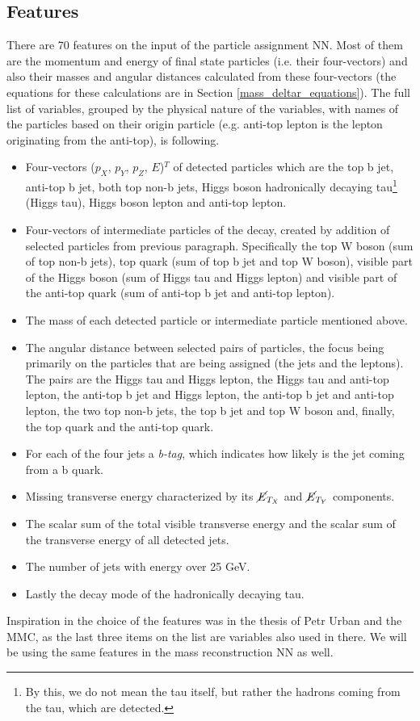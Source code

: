 \documentclass{ctuthesis}
\begin{document}
\subsection{Features}
\label{assignment_features}
There are 70 features on the input of the particle assignment NN. Most of them are the momentum and energy of final state particles (i.e. their four-vectors) and also their masses and angular distances calculated from these four-vectors (the equations for these calculations are in Section \ref{mass_deltar_equations}). The full list of variables, grouped by the physical nature of the variables, with names of the particles based on their origin particle (e.g. anti-top lepton is the lepton originating from the anti-top), is following.
\begin{itemize}
    \item Four-vectors ($p_X$, $p_Y$, $p_Z$, $E$)$^T$ of detected particles which are the top b jet, anti-top b jet, both top non-b jets, Higgs boson hadronically decaying tau\footnote{By this, we do not mean the tau itself, but rather the hadrons coming from the tau, which are detected.} (Higgs tau), Higgs boson lepton and anti-top lepton.
    \item Four-vectors of intermediate particles of the decay, created by addition of selected particles from previous paragraph. Specifically the top W boson (sum of top non-b jets), top quark (sum of top b jet and top W boson), visible part of the Higgs boson (sum of Higgs tau and Higgs lepton) and visible part of the anti-top quark (sum of anti-top b jet and anti-top lepton).
    \item The mass of each detected particle or intermediate particle mentioned above.
    \item The angular distance between selected pairs of particles, the focus being primarily on the particles that are being assigned (the jets and the leptons). The pairs are the Higgs tau and Higgs lepton, the Higgs tau and anti-top lepton, the anti-top b jet and Higgs lepton, the anti-top b jet and anti-top lepton, the two top non-b jets, the top b jet and top W boson and, finally, the top quark and the anti-top quark.
    \item For each of the four jets a \emph{b-tag}, which indicates how likely is the jet coming from a b quark.
    \item Missing transverse energy characterized by its $\cancel{E}_{T_X}$ and $\cancel{E}_{T_Y}$ components.
    \item The scalar sum of the total visible transverse energy and the scalar sum of the transverse energy of all detected jets.
    \item The number of jets with energy over 25 GeV.
    \item Lastly the decay mode of the hadronically decaying tau.
\end{itemize}
Inspiration in the choice of the features was in the thesis of Petr Urban \cite{decay_channel_image} and the MMC, as the last three items on the list are variables also used in there. We will be using the same features in the mass reconstruction NN as well.
\end{document}
